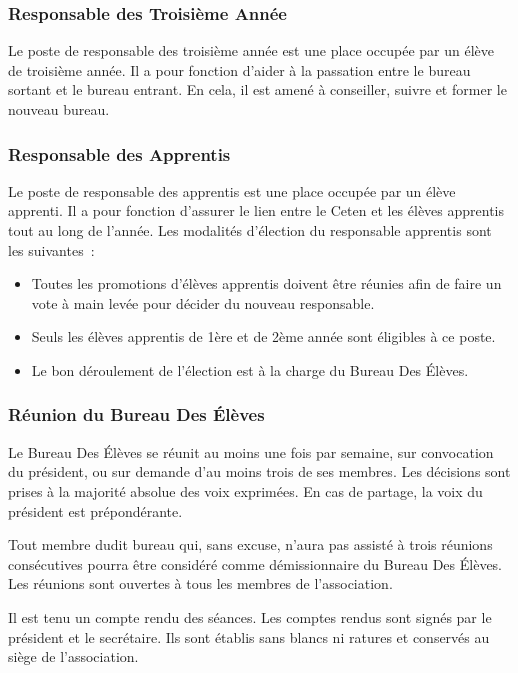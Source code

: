 \documentclass{article} %
\begin{document}
			\subsubsection{Responsable des Troisième Année}

				Le poste de responsable des troisième année est une place
				occupée par un élève de troisième année. Il a pour fonction
				d’aider à la passation entre le bureau sortant et le bureau
				entrant. En cela, il est amené à conseiller, suivre et former le
				nouveau bureau.

			\subsubsection{Responsable des Apprentis}

				Le poste de responsable des apprentis est une place occupée par
				un élève apprenti. Il a pour fonction d’assurer le lien entre le
				Ceten et les élèves apprentis tout au long de l’année. Les
				modalités d’élection du responsable apprentis sont les
				suivantes :
				\begin{itemize}
					\item Toutes les promotions d’élèves apprentis doivent être
						réunies afin de faire un vote à main levée pour décider
						du nouveau responsable.
					\item Seuls les élèves apprentis de 1ère et de 2ème année
						sont éligibles à ce poste.
					\item Le bon déroulement de l’élection est à la charge du
						Bureau Des Élèves.
				\end{itemize}

			\subsubsection{Réunion du Bureau Des Élèves}

				Le Bureau Des Élèves se réunit au moins une fois par semaine,
				sur convocation du président, ou sur demande d'au moins trois de
				ses membres. Les décisions sont prises à la majorité absolue des
				voix exprimées. En cas de partage, la voix du président est
				prépondérante. 

				Tout membre dudit bureau qui, sans excuse, n’aura pas assisté à
				trois réunions consécutives pourra être considéré comme
				démissionnaire du Bureau Des Élèves. Les réunions sont ouvertes
				à tous les membres de l’association.

				Il est tenu un compte rendu des séances. Les comptes rendus sont
				signés par le président et le secrétaire. Ils sont établis sans
				blancs ni ratures et conservés au siège de l’association.
\end{document}

